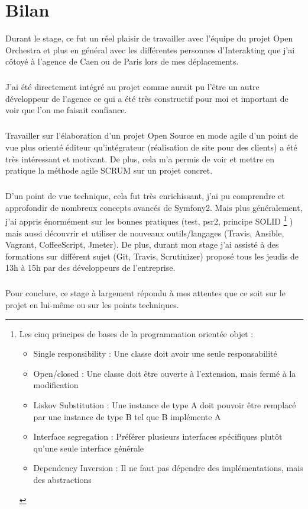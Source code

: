 \chapter*{Bilan}
Durant le stage, ce fut un réel plaisir de travailler avec l'équipe du projet Open Orchestra et plus en général avec les différentes personnes d'Interakting que j'ai côtoyé à l'agence de Caen ou de Paris lors de mes déplacements.
\paragraph{}
J'ai été directement intégré au projet comme aurait pu l'être un autre développeur de l'agence ce qui a été très constructif pour moi et important de voir que l'on me faisait confiance.
\paragraph{}
Travailler sur l'élaboration d'un projet Open Source en mode agile d'un point de vue plus orienté éditeur qu'intégrateur (réalisation de site pour des clients) a été très intéressant et motivant.  De plus, cela m'a permis de voir et mettre en pratique la méthode agile SCRUM sur un projet concret.
\paragraph{}
D'un point de vue technique, cela fut très enrichissant, j'ai pu comprendre et approfondir de nombreux concepts avancés de Symfony2. Mais plus généralement, j'ai appris énormément sur les bonnes pratiques (test, psr2, principe SOLID \footnote{Les cinq principes de bases de la programmation orientée objet :
\begin{itemize}
\item Single responsibility : Une classe doit avoir une seule responsabilité
\item Open/closed : Une classe doit être ouverte à l'extension, mais fermé à la modification
\item Liskov Substitution : Une instance de type A doit pouvoir être remplacé par une instance de type B tel que B implémente A
\item Interface segregation : Préférer plusieurs interfaces spécifiques plutôt qu'une seule interface générale
\item Dependency Inversion : Il ne faut pas dépendre des implémentations, mais des abstractions
\end{itemize}
}
) mais aussi découvrir et utiliser de nouveaux outils/langages (Travis, Ansible, Vagrant, CoffeeScript, Jmeter). 
De plus, durant mon stage j'ai assisté à des formations sur différent sujet (Git, Travis, Scrutinizer) proposé tous les jeudis de 13h à 15h par des développeurs de l'entreprise.
\paragraph{}
Pour conclure, ce stage à largement répondu à mes attentes que ce soit sur le projet en lui-même ou sur les points techniques.
